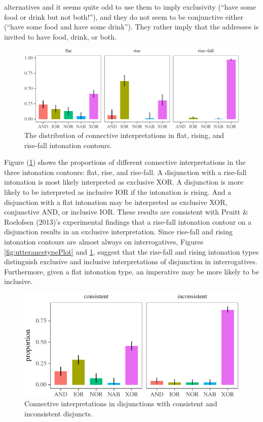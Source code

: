 \documentclass[oneside]{report}
\theoremstyle{definition}
\theoremstyle{definition}
\theoremstyle{definition}
\theoremstyle{remark}
\begin{document}
alternatives and it seems quite odd to use them to imply exclusivity
(``have some food or drink but not both!''), and they do not seem to be
conjunctive either (``have some food and have some drink''). They rather
imply that the addressee is invited to have food, drink, or both.
\begin{figure}[tb]

{\centering \includegraphics{figs/intonationPlot-1} 

}

\caption{The distribution of connective interpretations in flat, rising, and rise-fall intonation contours.}\label{fig:intonationPlot}
\end{figure}
Figure (\ref{fig:intonationPlot}) shows the proportions of different
connective interpretations in the three intonation contours: flat, rise,
and rise-fall. A disjunction with a rise-fall intonation is most likely
interpreted as exclusive XOR. A disjunction is more likely to be
interpreted as inclusive IOR if the intonation is rising. And a
disjunction with a flat intonation may be interpreted as exclusive XOR,
conjunctive AND, or inclusive IOR. These results are consistent with
Pruitt \& Roelofsen (2013)'s experimental findings that a rise-fall
intonation contour on a disjunction results in an exclusive
interpretation. Since rise-fall and rising intonation contours are
almost always on interrogatives, Figures \ref{fig:utterancetypePlot} and
\ref{fig:intonationPlot}, suggest that the rise-fall and rising
intonation types distinguish exclusive and inclusive interpretations of
disjunction in interrogatives. Furthermore, given a flat intonation
type, an imperative may be more likely to be inclusive.
\begin{figure}[tb]

{\centering \includegraphics{figs/consistencyPlot-1} 

}

\caption{Connective interpretations in disjunctions with consistent and inconsistent disjuncts.}\label{fig:consistencyPlot}
\end{figure}
\end{document}
